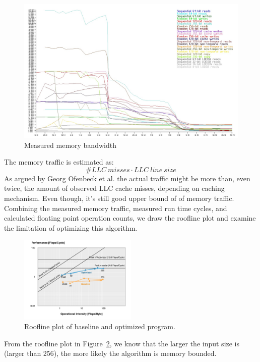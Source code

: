 \begin{figure}
\centering
\includegraphics[scale=0.25]{./pic/bandwidth.jpg}
\caption{Measured memory bandwidth}
\label{fig:mem-bw}
\end{figure}

The memory traffic is estimated as: 
$$
\# LLC\ misses \cdot LLC\ line\ size
$$
As argued by Georg Ofenbeck et al.\cite{ofenbeck2014applying} the actual traffic might be more than, even twice, the amount of observed LLC cache misses, depending on caching mechanism. Even though, it's still good upper bound of of memory traffic. Combining the measured memory traffic, measured run time cycles, and calculated floating point operation counts, we draw the roofline plot and examine the limitation of optimizing this algorithm.

\begin{figure}[h]
\centering
\includegraphics[width=0.5\textwidth]{./pic/roofline.png}
\caption{Roofline plot of baseline and optimized program.}
\label{fig:roofline}
\end{figure}

From the roofline plot in Figure~\ref{fig:roofline}, we know that the larger the input size is (larger than 256), the more likely the algorithm is memory bounded.





